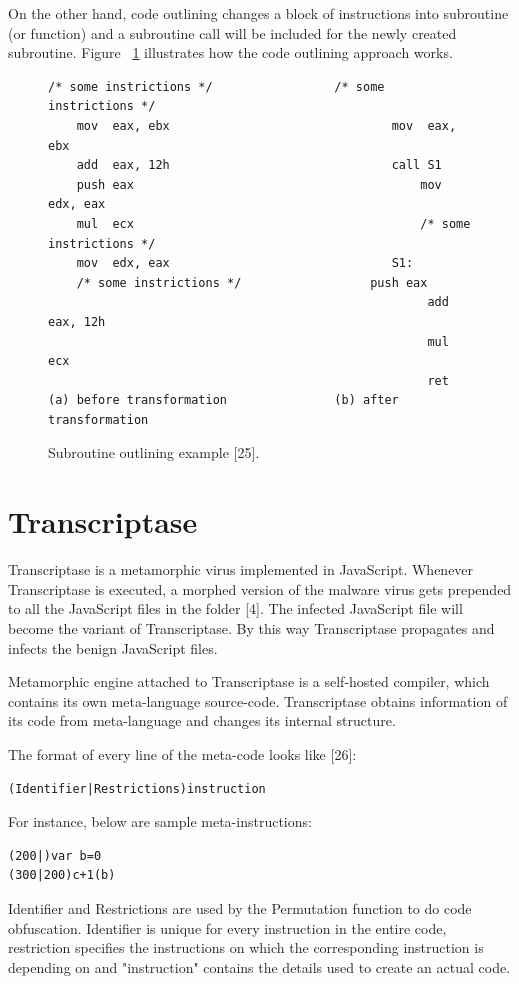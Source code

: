 On the other hand, code outlining changes a block of instructions into subroutine (or function) and a subroutine call will be included for the newly created subroutine. Figure ~\ref{fig:subroutineoutline} illustrates how the code outlining approach works.
\begin{figure}
  \centering
  \begin{lstlisting}[language=myasm]
	/* some instrictions */					/* some instrictions */
	mov  eax, ebx								mov  eax, ebx
	add  eax, 12h								call S1
	push eax										mov  edx, eax
	mul  ecx										/* some instrictions */
	mov  edx, eax								S1: 
	/* some instrictions */ 				 push eax
										 	 	 	 add  eax, 12h
										 	 	 	 mul  ecx
										 	 	 	 ret
(a) before transformation				(b) after transformation
\end{lstlisting}


    \caption[Subroutine outlining example]{Subroutine outlining example [25].}
    \label{fig:subroutineoutline}
\end{figure}

\section{Transcriptase}

Transcriptase is a metamorphic virus implemented in JavaScript. Whenever Transcriptase is executed, a morphed version of the malware virus gets prepended to all the JavaScript files in the folder [4]. The infected JavaScript file will become the variant of Transcriptase. By this way Transcriptase propagates and infects the benign JavaScript files.
  
Metamorphic engine attached to Transcriptase is a self-hosted compiler, which contains its own meta-language source-code. Transcriptase obtains information of its code from meta-language and changes its internal structure. 

The format of every line of the meta-code looks like [26]:

\begin{lstlisting}[frame=none,numbers=none]
(Identifier|Restrictions)instruction
\end{lstlisting}
For instance, below are sample meta-instructions:

\begin{lstlisting}[frame=none,numbers=none]
(200|)var b=0
(300|200)c+1(b)
\end{lstlisting}

Identifier and Restrictions are used by the Permutation function to do code obfuscation. Identifier is unique for every instruction in the entire code, restriction specifies the instructions on which the corresponding instruction is depending on and "instruction" contains the details used to create an actual code. 

